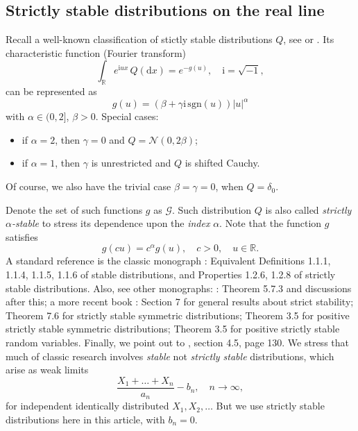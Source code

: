 \documentclass[12pt]{amsart}
\theoremstyle{remark}
\theoremstyle{definition}
\begin{document}
\subsection{Strictly stable distributions on the real line} Recall a well-known classification of stictly stable distributions $Q$, see \cite[Chapter 1]{STbook} or \cite[Chapter V]{SteutelBook}. Its characteristic function (Fourier transform) 
$$
\int_{\mathbb R}e^{\mathrm{i}ux}\,Q(\mathrm{d}x) = e^{-g(u)},\quad \mathrm{i} =  \sqrt{-1},
$$
can be represented as
\begin{equation}
\label{eq:G}
g(u) = (\beta + \gamma\mathrm{i}\,\mathrm{sgn}(u))|u|^{\alpha}
\end{equation}
with $\alpha \in (0, 2]$, $\beta > 0$. Special cases:
\begin{itemize}
\item if $\alpha = 2$, then $\gamma = 0$ and $Q = \mathcal N(0, 2\beta)$;
\item if $\alpha = 1$, then $\gamma$ is unrestricted and $Q$ is shifted Cauchy.
\end{itemize}
Of course, we also have the trivial case $\beta = \gamma = 0$, when $Q = \delta_0$.

Denote the set of such functions $g$ as $\mathcal G$. Such distribution $Q$ is also called {\it strictly $\alpha$-stable} to stress its dependence upon the {\it index} $\alpha$. Note that the function $g$ satisfies 
\begin{equation}
\label{eq:homo}
g(cu) = c^{\alpha}g(u),\quad c > 0,\quad u \in \mathbb R. 
\end{equation}
A standard reference is the classic monograph \cite[Chapter 1]{STbook}: Equivalent Definitions 1.1.1, 1.1.4, 1.1.5, 1.1.6 of stable distributions, and Properties 1.2.6, 1.2.8 of strictly stable distributions. Also, see other monographs: \cite[Chapter 3]{FTbook}: Theorem 5.7.3 and discussions after this; a more recent book \cite[Chapter V]{SteutelBook}: Section 7 for general results about strict stability; Theorem 7.6 for strictly stable symmetric distributions; Theorem 3.5 for positive strictly stable symmetric distributions; Theorem 3.5 for positive strictly stable random variables. Finally, we point out to \cite[Chapter 4]{GnedenkoBook}, section 4.5, page 130. We stress that much of classic research involves {\it stable} not {\it strictly stable} distributions, which arise as weak limits 
\begin{equation}
\label{eq:stable-weak-limits}
\frac{X_1 + \ldots + X_n}{a_n} - b_n,\quad n \to \infty,
\end{equation}
for independent identically distributed $X_1, X_2, \ldots$ But we use strictly stable distributions here in this article, with $b_n = 0$. 
\end{document}
